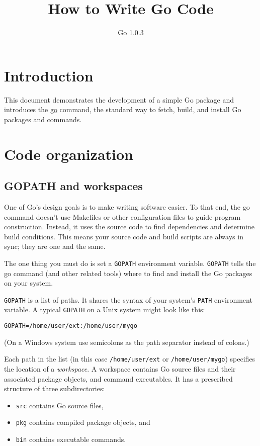 \documentclass{article}
\title{How to Write Go Code}
\author{Go 1.0.3}
\begin{document}
\maketitle

\section *{Introduction}
This document demonstrates the development of a simple Go package
and introduces the \href{http://golang.org/cmd/go/}{go} command,
the standard way to fetch, build, and install Go packages and
commands.

\section*{Code organization}
\subsection*{GOPATH and workspaces}

One of Go's design goals is to make writing software easier. To
that end, the go command doesn't use Makefiles or other configuration
files to guide program construction. Instead, it uses the source
code to find dependencies and determine build conditions. This means
your source code and build scripts are always in sync; they are one
and the same.

The one thing you must do is set a \verb|GOPATH| environment variable.
\verb|GOPATH| tells the go command (and other related tools) where to find
and install the Go packages on your system.

\verb|GOPATH| is a list of paths. It shares the syntax of your
system's \verb|PATH| environment variable. A typical \verb|GOPATH|
on a Unix system might look like this:

\begin{Verbatim}[frame=single]
GOPATH=/home/user/ext:/home/user/mygo
\end{Verbatim}

(On a Windows system use semicolons as the path separator instead of colons.)

Each path in the list (in this case \verb|/home/user/ext| or
\verb|/home/user/mygo|) specifies the location of a \textit{workspace}.
A workspace contains Go source files and their associated package
objects, and command executables. It has a prescribed structure of
three subdirectories:

\begin{itemize}
  \item \verb|src| contains Go source files,
  \item \verb|pkg| contains compiled package objects, and
  \item \verb|bin| contains executable commands.
\end{itemize}
\end{document}
